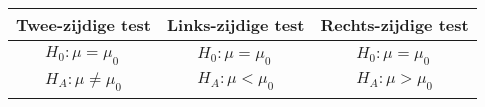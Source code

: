 \documentclass[a5paper]{article}
\begin{document}
\begin{center}
\begin{tabular}{|c|c|c|}
\hline
\textbf{Twee-zijdige test} & \textbf{Links-zijdige test} & \textbf{Rechts-zijdige test} \\
\hline
$\begin{array}{l}
H_0 : \mu = \mu_0 \\
H_A : \mu \ne \mu_0
\end{array}$ &
$\begin{array}{l}
H_0 : \mu = \mu_0 \\
H_A : \mu < \mu_0
\end{array}$ &
$\begin{array}{l}
H_0 : \mu = \mu_0 \\
H_A : \mu > \mu_0
\end{array}$ \\
\hline


\end{tabular}
\end{center}
\end{document}
